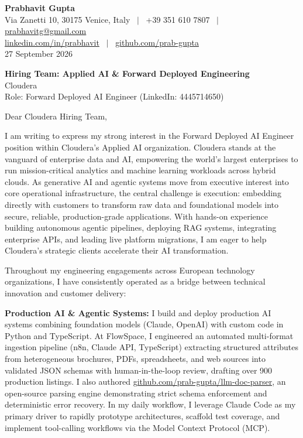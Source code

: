 \documentclass[10.5pt,a4paper]{article}
\begin{document}
\textbf{\large Prabhavit Gupta}\\
Via Zanetti 10, 30175 Venice, Italy ~$\vert$~ +39 351 610 7807 ~$\vert$~ \href{mailto:prabhavitg@gmail.com}{prabhavitg@gmail.com}\\
\href{https://www.linkedin.com/in/prabhavit/}{linkedin.com/in/prabhavit} ~$\vert$~ \href{https://github.com/prab-gupta}{github.com/prab-gupta}\\
27 September 2026

\textbf{Hiring Team: Applied AI \& Forward Deployed Engineering}\\
Cloudera\\
Role: Forward Deployed AI Engineer (LinkedIn: 4445714650)

Dear Cloudera Hiring Team,

I am writing to express my strong interest in the Forward Deployed AI Engineer position within Cloudera's Applied AI organization. Cloudera stands at the vanguard of enterprise data and AI, empowering the world's largest enterprises to run mission-critical analytics and machine learning workloads across hybrid clouds. As generative AI and agentic systems move from executive interest into core operational infrastructure, the central challenge is execution: embedding directly with customers to transform raw data and foundational models into secure, reliable, production-grade applications. With hands-on experience building autonomous agentic pipelines, deploying RAG systems, integrating enterprise APIs, and leading live platform migrations, I am eager to help Cloudera's strategic clients accelerate their AI transformation.

Throughout my engineering engagements across European technology organizations, I have consistently operated as a bridge between technical innovation and customer delivery:

\textbf{Production AI \& Agentic Systems:} I build and deploy production AI systems combining foundation models (Claude, OpenAI) with custom code in Python and TypeScript. At FlowSpace, I engineered an automated multi-format ingestion pipeline (n8n, Claude API, TypeScript) extracting structured attributes from heterogeneous brochures, PDFs, spreadsheets, and web sources into validated JSON schemas with human-in-the-loop review, drafting over 900 production listings. I also authored \href{https://github.com/prab-gupta/llm-doc-parser}{github.com/prab-gupta/llm-doc-parser}, an open-source parsing engine demonstrating strict schema enforcement and deterministic error recovery. In my daily workflow, I leverage Claude Code as my primary driver to rapidly prototype architectures, scaffold test coverage, and implement tool-calling workflows via the Model Context Protocol (MCP).
\end{document}
